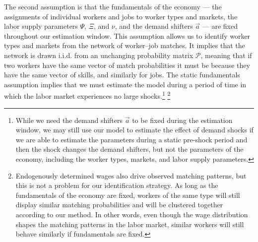 \documentclass[12pt]{article}
\def\ig{\iota\gamma}
\def\g{\gamma}
\theoremstyle{definition}
\theoremstyle{plain}
\begin{document}
The second assumption is that the fundamentals of the economy --- the assignments of individual workers and jobs to worker types and markets, the labor supply parameters $\Psi$, $\Xi$, and $\nu$, and the demand shifters $\vec{a}$ --- are fixed throughout our estimation window. This assumption allows us to identify worker types and markets from the network of worker--job matches. It implies that the network is drawn i.i.d. from an unchanging probability matrix $\mathcal{P}$, meaning that if two workers have the same vector of match probabilities it must be because they have the same vector of skills, and similarly for jobs. The static fundamentals assumption implies that we must estimate the model during a period of time in which the labor market experiences no large shocks.\footnote{While we need the demand shifters $\vec{a}$ to be fixed during the estimation window, we may still use our model to estimate the effect of demand shocks if we are able to estimate the parameters during a static pre-shock period and then the shock changes the demand shifters, but not the parameters of the economy, including the worker types, markets, and labor supply parameters.} %
\footnote{Endogenously determined wages also drive observed matching patterns, but this is not a problem for our identification strategy. As long as the fundamentals of the economy are fixed, workers of the same type will still display similar matching probabilities and will be clustered together according to our method. In other words, even though the wage distribution shapes the matching patterns in the labor market, similar workers will still behave similarly if fundamentals are fixed.}

\end{document}
